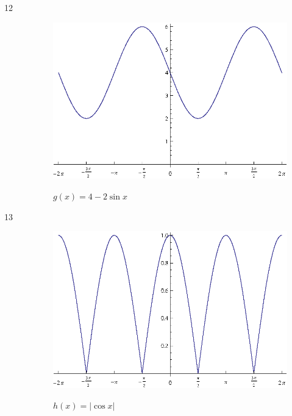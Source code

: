 \documentclass{exam}
\begin{document}
\begin{description}
      \item[12]
        \begin{figure}[H]
          \centering
          \includegraphics[scale=0.9]{exercise12.eps}

          $g(x) = 4 - 2 \sin x$
        \end{figure}

      \item[13]
        \begin{figure}[H]
          \centering
          \includegraphics[scale=0.9]{exercise13.eps}

          $h(x) = | \cos x |$
        \end{figure}


\end{description}
\end{document}
